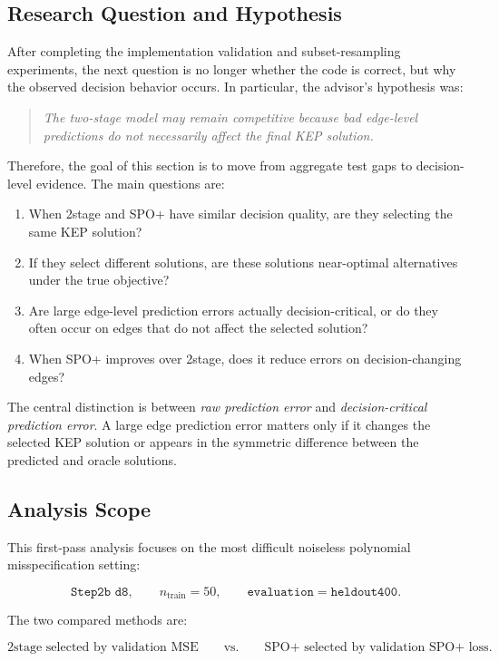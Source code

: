 \documentclass[11pt]{article}
\begin{document}
\subsection{Research Question and Hypothesis}
After completing the implementation validation and subset-resampling
experiments, the next question is no longer whether the code is correct, but
why the observed decision behavior occurs. In particular, the advisor's
hypothesis was:

\begin{quote}
\emph{The two-stage model may remain competitive because bad edge-level
predictions do not necessarily affect the final KEP solution.}
\end{quote}

Therefore, the goal of this section is to move from aggregate test gaps to
decision-level evidence. The main questions are:

\begin{enumerate}
    \item When 2stage and SPO+ have similar decision quality, are they selecting
    the same KEP solution?
    \item If they select different solutions, are these solutions near-optimal
    alternatives under the true objective?
    \item Are large edge-level prediction errors actually decision-critical, or
    do they often occur on edges that do not affect the selected solution?
    \item When SPO+ improves over 2stage, does it reduce errors on
    decision-changing edges?
\end{enumerate}

The central distinction is between \emph{raw prediction error} and
\emph{decision-critical prediction error}. A large edge prediction error matters
only if it changes the selected KEP solution or appears in the symmetric
difference between the predicted and oracle solutions.

\subsection{Analysis Scope}
This first-pass analysis focuses on the most difficult noiseless polynomial
misspecification setting:

\[
\texttt{Step2b d8}, \qquad n_{\mathrm{train}} = 50,
\qquad \texttt{evaluation} = \texttt{heldout400}.
\]

The two compared methods are:

\[
\text{2stage selected by validation MSE}
\qquad \text{vs.} \qquad
\text{SPO+ selected by validation SPO+ loss}.
\]
\end{document}
